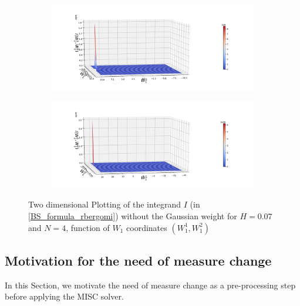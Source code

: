 \documentclass[11pt]{article}
\begin{document}
\begin{figure}[h!]
	\centering
	\begin{subfigure}{.4\textwidth}
		\centering
		\includegraphics[width=1\linewidth]{./figures/integrand_plotting_rBergomi/2D_plots/N_4/H_007/integrand_without_density/Bergomi_integrand_contours_K_1_H_007_W1_1_2_N_4_without_weights_80}
		\caption{}
		\label{fig:sub3}
	\end{subfigure}%
	\begin{subfigure}{.4\textwidth}
		\centering
		\includegraphics[width=1\linewidth]{./figures/integrand_plotting_rBergomi/2D_plots/N_4/H_007/integrand_without_density/Bergomi_integrand_contours_K_1_H_007_W1_1_2_N_4_without_weights_2_80}
		\caption{}
		\label{fig:sub4}
	\end{subfigure}
	
	\caption{Two dimensional Plotting of the integrand $I$ (in \eqref{BS_formula_rbergomi}) without the Gaussian weight  for $H=0.07$ and $N=4$, function of $W_1$ coordinates $(W_1^1,W^2_1)$}
	\label{fig:Two dimensional Plotting of the integrand $I$_W11_view}
\end{figure}

\newpage
\subsection{Motivation for the need of measure change}\label{sec:Motivation for the need of measure change}
In this Section, we motivate the need of measure change as a pre-processing step before applying the MISC solver.
\end{document}
